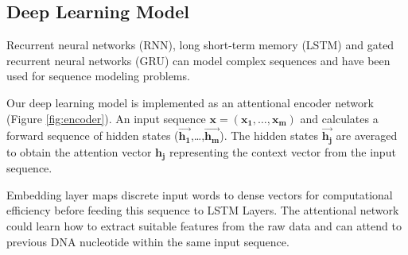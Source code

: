 \documentclass[conference]{IEEEtran}
\begin{document}

\subsection{Deep Learning Model}
Recurrent neural networks (RNN), long short-term memory (LSTM) \cite{hochreiter1997long} and gated recurrent neural networks (GRU) \cite{chung2014empirical} can model complex sequences and have been used for sequence modeling problems.

Our deep learning model is implemented as an attentional encoder network (Figure \ref{fig:encoder}). An input sequence  $\mathbf{x = (x_{1} , \ldots{} , x_{m} )}$  and calculates a forward sequence of hidden states  ($\mathbf{\overrightarrow{h_{1}}}$,\ldots{},$\mathbf{ \overrightarrow{h_{m}}}$). The hidden states $\mathbf{\overrightarrow{h_{j}}}$  are averaged to obtain the attention vector $\mathbf{h_{j}}$ representing the context vector from the input sequence.

Embedding layer maps discrete input words to dense vectors for computational efficiency before feeding this sequence to LSTM Layers. The attentional network could learn how to extract suitable features from the raw data and can attend to previous DNA nucleotide within the same input sequence. 

\end{document}
